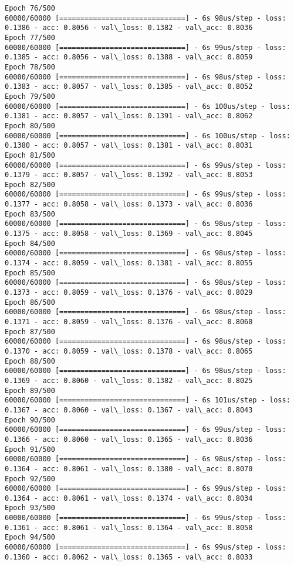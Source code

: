 \documentclass[11pt]{article}
\begin{document}
\begin{Verbatim}[commandchars=\\\{\}]
Epoch 76/500
60000/60000 [==============================] - 6s 98us/step - loss: 0.1386 - acc: 0.8056 - val\_loss: 0.1382 - val\_acc: 0.8036
Epoch 77/500
60000/60000 [==============================] - 6s 99us/step - loss: 0.1385 - acc: 0.8056 - val\_loss: 0.1388 - val\_acc: 0.8059
Epoch 78/500
60000/60000 [==============================] - 6s 98us/step - loss: 0.1383 - acc: 0.8057 - val\_loss: 0.1385 - val\_acc: 0.8052
Epoch 79/500
60000/60000 [==============================] - 6s 100us/step - loss: 0.1381 - acc: 0.8057 - val\_loss: 0.1391 - val\_acc: 0.8062
Epoch 80/500
60000/60000 [==============================] - 6s 100us/step - loss: 0.1380 - acc: 0.8057 - val\_loss: 0.1381 - val\_acc: 0.8031
Epoch 81/500
60000/60000 [==============================] - 6s 99us/step - loss: 0.1379 - acc: 0.8057 - val\_loss: 0.1392 - val\_acc: 0.8053
Epoch 82/500
60000/60000 [==============================] - 6s 99us/step - loss: 0.1377 - acc: 0.8058 - val\_loss: 0.1373 - val\_acc: 0.8036
Epoch 83/500
60000/60000 [==============================] - 6s 98us/step - loss: 0.1375 - acc: 0.8058 - val\_loss: 0.1369 - val\_acc: 0.8045
Epoch 84/500
60000/60000 [==============================] - 6s 98us/step - loss: 0.1374 - acc: 0.8059 - val\_loss: 0.1381 - val\_acc: 0.8055
Epoch 85/500
60000/60000 [==============================] - 6s 98us/step - loss: 0.1373 - acc: 0.8059 - val\_loss: 0.1376 - val\_acc: 0.8029
Epoch 86/500
60000/60000 [==============================] - 6s 98us/step - loss: 0.1371 - acc: 0.8059 - val\_loss: 0.1376 - val\_acc: 0.8060
Epoch 87/500
60000/60000 [==============================] - 6s 98us/step - loss: 0.1370 - acc: 0.8059 - val\_loss: 0.1378 - val\_acc: 0.8065
Epoch 88/500
60000/60000 [==============================] - 6s 98us/step - loss: 0.1369 - acc: 0.8060 - val\_loss: 0.1382 - val\_acc: 0.8025
Epoch 89/500
60000/60000 [==============================] - 6s 101us/step - loss: 0.1367 - acc: 0.8060 - val\_loss: 0.1367 - val\_acc: 0.8043
Epoch 90/500
60000/60000 [==============================] - 6s 99us/step - loss: 0.1366 - acc: 0.8060 - val\_loss: 0.1365 - val\_acc: 0.8036
Epoch 91/500
60000/60000 [==============================] - 6s 98us/step - loss: 0.1364 - acc: 0.8061 - val\_loss: 0.1380 - val\_acc: 0.8070
Epoch 92/500
60000/60000 [==============================] - 6s 99us/step - loss: 0.1364 - acc: 0.8061 - val\_loss: 0.1374 - val\_acc: 0.8034
Epoch 93/500
60000/60000 [==============================] - 6s 99us/step - loss: 0.1361 - acc: 0.8061 - val\_loss: 0.1364 - val\_acc: 0.8058
Epoch 94/500
60000/60000 [==============================] - 6s 99us/step - loss: 0.1360 - acc: 0.8062 - val\_loss: 0.1365 - val\_acc: 0.8033

\end{Verbatim}
\end{document}
